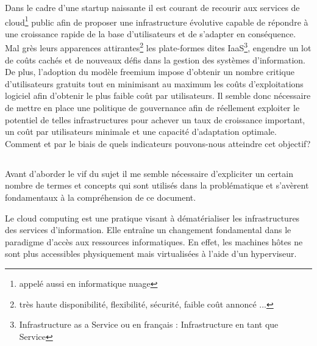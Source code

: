 \documentclass[11pt, a4paper ]{article}
\begin{document}
\begin{spacing}{1.5}
Dans le cadre d'une startup naissante il est courant de recourir aux services de cloud\footnote{appelé aussi en informatique nuage} public afin de proposer une infrastructure évolutive capable de répondre à une croissance rapide de la base d'utilisateurs et de s'adapter en conséquence.
Mal grès leurs apparences attirantes\footnote{très haute disponibilité, flexibilité, sécurité, faible coût annoncé ...} les plate-formes dites IaaS\footnote{Infrastructure as a Service ou en français : Infrastructure en tant que Service}, engendre un lot de coûts cachés et de nouveaux défis dans la gestion des systèmes d'information.
De plus, l'adoption du modèle freemium impose d'obtenir un nombre critique d'utilisateurs gratuits tout en minimisant au maximum les coûts d'exploitations logiciel afin d'obtenir le plus faible coût par utilisateurs.
Il semble donc nécessaire de mettre en place une politique de gouvernance afin de réellement exploiter le potentiel de telles infrastructures pour achever un taux de croissance important, un coût par utilisateurs minimale et une capacité d'adaptation optimale. Comment et par le biais de quels indicateurs pouvons-nous atteindre cet objectif?


			\subsection*{}

Avant d'aborder le vif du sujet il me semble nécessaire d'expliciter un certain nombre de termes et concepts qui sont utilisés dans la problématique et s'avèrent fondamentaux à la compréhension de ce document.

Le cloud computing\cite{cloudDef} est une pratique visant à dématérialiser les infrastructures des services d'information. Elle entraîne un changement fondamental dans le paradigme d'accès aux ressources informatiques. En effet, les machines hôtes ne sont plus accessibles physiquement mais virtualisées à l'aide d'un hyperviseur.


\end{spacing}
\end{document}
